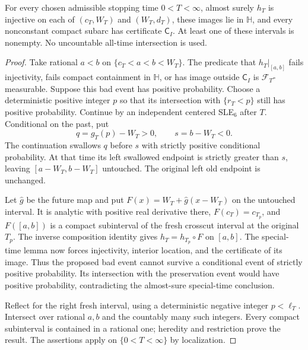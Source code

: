 \begin{theorem}
\label{thm:stopping-frontier-certified}
For every chosen admissible stopping time $0<T<\infty$, almost surely
$h_T$ is injective on each of $(c_T,W_T)$ and $(W_T,d_T)$,
these images lie in $\mathbb H$, and every nonconstant compact
subarc has certificate $\mathsf C_I$. At least one of these
intervals is nonempty. No uncountable all-time intersection is used.
\end{theorem}
\begin{proof}
Take rational $a<b$ on $\{c_T<a<b<W_T\}$.
The predicate that $h_T|_{[a,b]}$ fails injectivity, fails compact
containment in $\mathbb H$, or has image outside $\mathsf C_I$ is
$\mathcal F_T$-measurable. Suppose this bad event has positive
probability. Choose a deterministic positive integer $p$ so that
its intersection with $\{r_T<p\}$ still has positive probability.
Continue by an independent centered SLE$_6$ after $T$. Conditional
on the past, put
\[
 q=g_T(p)-W_T>0,\qquad s=b-W_T<0.
 \tag{FB2}
\]
The continuation swallows $q$ before $s$ with strictly positive
conditional probability. At that time its left swallowed endpoint
is strictly greater than $s$, leaving $[a-W_T,b-W_T]$ untouched.
The original left old endpoint is unchanged.

Let $\widehat g$ be the future map and put
$F(x)=W_T+\widehat g(x-W_T)$ on the untouched interval.
It is analytic with positive real derivative there,
$F(c_T)=c_{T_p}$, and $F([a,b])$ is a compact subinterval of the
fresh crosscut interval at the original $T_p$. The inverse
composition identity gives $h_T=h_{T_p}\circ F$ on $[a,b]$.
The special-time lemma now forces injectivity, interior location,
and the certificate of its image. Thus the proposed bad event
cannot survive a conditional event of strictly positive probability.
Its intersection with the preservation event would have positive
probability, contradicting the almost-sure special-time conclusion.

Reflect for the right fresh interval, using a deterministic negative
integer $p<\ell_T$. Intersect over rational $a,b$ and the countably
many such integers. Every compact subinterval is contained in a
rational one; heredity and restriction prove the result.
The assertions apply on $\{0<T<\infty\}$ by localization.
\end{proof}

